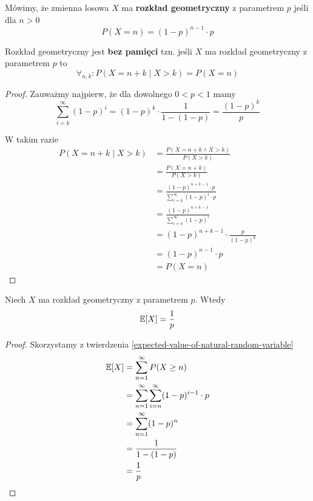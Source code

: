 \begin{definition}
    Mówimy, że zmienna losowa \( X \) ma \textbf{rozkład geometryczny} z parametrem \( p \) jeśli
    dla \( n > 0 \) 
    \[
        P(X = n) = (1 - p)^{n-1} \cdot p
    \]
\end{definition}

\begin{theorem}[Lemat 2.8 P\&C]
    Rozkład geometryczny jest \textbf{bez pamięci} tzn. jeśli \( X \) ma rozkład geometryczny z parametrem \( p \) to
    \[
        \forall_{n, k} : P(X = n + k \mid X > k) = P(X = n) 
    \]
\end{theorem}
\begin{proof}
    Zauważmy najpierw, że dla dowolnego \( 0 < p < 1 \) mamy
    \[
        \sum_{i=k}^\infty (1-p)^i = (1-p)^k \cdot \frac{1}{1 - (1-p)} = \frac{(1-p)^k}{p}
    \]
    
    W takim razie
    \begin{align*}
        P(X = n + k \mid X > k)
            &= \frac{P(X = n + k \land X > k)}{P(X > k)} \\
            &= \frac{P(X = n + k)}{P(X > k)} \\
            &= \frac{(1 - p)^{n + k - 1} \cdot p}{\sum_{i=k}^\infty (1-p)^i \cdot p} \\
            &= \frac{(1-p)^{n + k - 1}}{\sum_{i=k}^\infty (1-p)^i} \\
            &= (1-p)^{n + k - 1} \cdot \frac{p}{(1-p)^k} \\
            &= (1-p)^{n-1} \cdot p \\
            &= P(X = n)
    \end{align*}
\end{proof}

\begin{theorem}
    Niech \( X \) ma rozkład geometryczny z parametrem \( p \). Wtedy
    \[
        \expected{X} = \frac{1}{p}
    \]
\end{theorem}
\begin{proof}
    Skorzystamy z twierdzenia \ref{expected-value-of-natural-random-variable}
    \begin{align*}
        \expected{X}
            &= \sum_{n=1}^\infty P(X \geq n) \\
            &= \sum_{n=1}^\infty \sum_{i=n}^\infty (1-p)^{i-1} \cdot p \\
            &= \sum_{n=1}^\infty (1-p)^n \\
            &= \frac{1}{1 - (1-p)} \\
            &= \frac{1}{p}
    \end{align*}
\end{proof}


